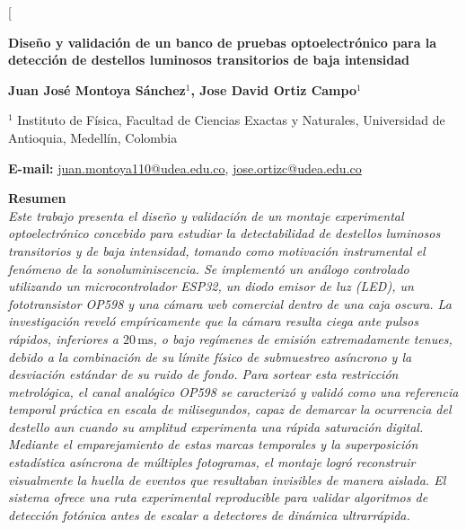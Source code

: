 \documentclass[10pt,a4paper,twocolumn]{article}
\begin{document}
\renewcommand{\figurename}{Figura}
\renewcommand{\tablename}{Tabla}

\twocolumn[
  \begin{@twocolumnfalse}
    \vspace{0.5cm}
    
    {\Huge \textbf{Diseño y validación de un banco de pruebas optoelectrónico para la detección de destellos luminosos transitorios de baja intensidad}}
    
    \vspace{0.8cm}
    
    {\large \textbf{Juan José Montoya Sánchez$^1$, Jose David Ortiz Campo$^1$}}
    
    \vspace{0.3cm}
    
    {\small $^1$ Instituto de Física, Facultad de Ciencias Exactas y Naturales, Universidad de Antioquia, Medellín, Colombia}
    
    \vspace{0.4cm}
    
    {\small \textbf{E-mail:} \url{juan.montoya110@udea.edu.co}, \url{jose.ortizc@udea.edu.co}}
    
    \vspace{0.8cm}
    
    \textbf{\large Resumen} \\
    \textit{Este trabajo presenta el diseño y validación de un montaje experimental optoelectrónico concebido para estudiar la detectabilidad de destellos luminosos transitorios y de baja intensidad, tomando como motivación instrumental el fenómeno de la sonoluminiscencia. Se implementó un análogo controlado utilizando un microcontrolador ESP32, un diodo emisor de luz (LED), un fototransistor OP598 y una cámara web comercial dentro de una caja oscura. La investigación reveló empíricamente que la cámara resulta ciega ante pulsos rápidos, inferiores a \(20\,\mathrm{ms}\), o bajo regímenes de emisión extremadamente tenues, debido a la combinación de su límite físico de submuestreo asíncrono y la desviación estándar de su ruido de fondo. Para sortear esta restricción metrológica, el canal analógico OP598 se caracterizó y validó como una referencia temporal práctica en escala de milisegundos, capaz de demarcar la ocurrencia del destello aun cuando su amplitud experimenta una rápida saturación digital. Mediante el emparejamiento de estas marcas temporales y la superposición estadística asíncrona de múltiples fotogramas, el montaje logró reconstruir visualmente la huella de eventos que resultaban invisibles de manera aislada. El sistema ofrece una ruta experimental reproducible para validar algoritmos de detección fotónica antes de escalar a detectores de dinámica ultrarrápida.}
    

\end{@twocolumnfalse}
\end{document}
